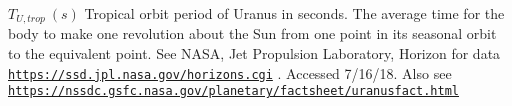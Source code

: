 $ T_{U,trop} \ (s)$ Tropical orbit period of Uranus in seconds. The average time for the body to make one revolution about the Sun from one point in its seasonal orbit to the equivalent point. See N\+A\+SA, Jet Propulsion Laboratory, Horizon for data \href{https://ssd.jpl.nasa.gov/horizons.cgi}{\tt https\+://ssd.\+jpl.\+nasa.\+gov/horizons.\+cgi} . Accessed 7/16/18. Also see \href{https://nssdc.gsfc.nasa.gov/planetary/factsheet/uranusfact.html}{\tt https\+://nssdc.\+gsfc.\+nasa.\+gov/planetary/factsheet/uranusfact.\+html} 